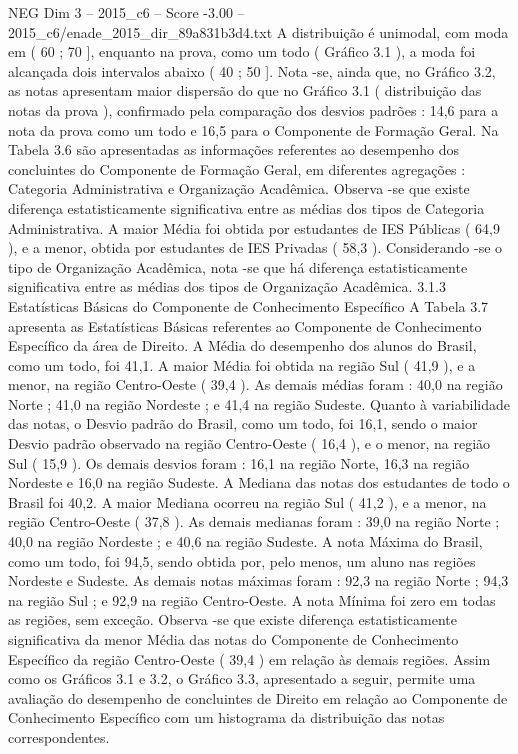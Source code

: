\begin{textsample}{NEG Dim 3 – 2015\_c6 – Score -3.00 – 2015\_c6/enade\_2015\_dir\_89a831b3d4.txt}
A distribuição é unimodal, com moda em ( 60 ; 70 ], enquanto na prova, como um todo ( Gráfico 3.1 ), a moda foi alcançada dois intervalos abaixo ( 40 ; 50 ].
Nota -se, ainda que, no Gráfico 3.2, as notas apresentam maior dispersão do que no Gráfico 3.1 ( distribuição das notas da prova ), confirmado pela comparação dos desvios padrões : 14,6 para a nota da prova como um todo e 16,5 para o Componente de Formação Geral.
Na Tabela 3.6 são apresentadas as informações referentes ao desempenho dos concluintes do Componente de Formação Geral, em diferentes agregações : Categoria Administrativa e Organização Acadêmica.
Observa -se que existe diferença estatisticamente significativa entre as médias dos tipos de Categoria Administrativa.
A maior Média foi obtida por estudantes de IES Públicas ( 64,9 ), e a menor, obtida por estudantes de IES Privadas ( 58,3 ).
Considerando -se o tipo de Organização Acadêmica, nota -se que há diferença estatisticamente significativa entre as médias dos tipos de Organização Acadêmica. 3.1.3 Estatísticas Básicas do Componente de Conhecimento Específico A Tabela 3.7 apresenta as Estatísticas Básicas referentes ao Componente de Conhecimento Específico da área de Direito.
A Média do desempenho dos alunos do Brasil, como um todo, foi 41,1.
A maior Média foi obtida na região Sul ( 41,9 ), e a menor, na região Centro-Oeste ( 39,4 ).
As demais médias foram : 40,0 na região Norte ; 41,0 na região Nordeste ; e 41,4 na região Sudeste.
Quanto à variabilidade das notas, o Desvio padrão do Brasil, como um todo, foi 16,1, sendo o maior Desvio padrão observado na região Centro-Oeste ( 16,4 ), e o menor, na região Sul ( 15,9 ).
Os demais desvios foram : 16,1 na região Norte, 16,3 na região Nordeste e 16,0 na região Sudeste.
A Mediana das notas dos estudantes de todo o Brasil foi 40,2.
A maior Mediana ocorreu na região Sul ( 41,2 ), e a menor, na região Centro-Oeste ( 37,8 ).
As demais medianas foram : 39,0 na região Norte ; 40,0 na região Nordeste ; e 40,6 na região Sudeste.
A nota Máxima do Brasil, como um todo, foi 94,5, sendo obtida por, pelo menos, um aluno nas regiões Nordeste e Sudeste.
As demais notas máximas foram : 92,3 na região Norte ; 94,3 na região Sul ; e 92,9 na região Centro-Oeste.
A nota Mínima foi zero em todas as regiões, sem exceção.
Observa -se que existe diferença estatisticamente significativa da menor Média das notas do Componente de Conhecimento Específico da região Centro-Oeste ( 39,4 ) em relação às demais regiões.
Assim como os Gráficos 3.1 e 3.2, o Gráfico 3.3, apresentado a seguir, permite uma avaliação do desempenho de concluintes de Direito em relação ao Componente de Conhecimento Específico com um histograma da distribuição das notas correspondentes.

\end{textsample}
